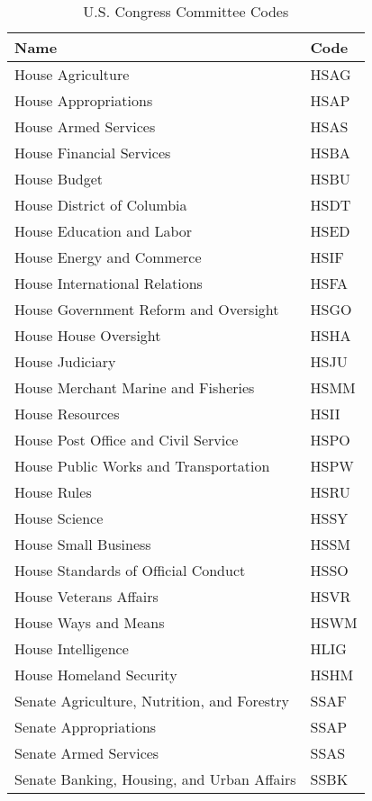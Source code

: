 \documentclass[10pt,a4paper]{article}
\begin{document}
\begin{table}  \centering
\caption{U.S. Congress Committee Codes}
\label{tab:committee}
\begin{tabular}{ll}
\textbf{Name} & \textbf{Code} \\
\hline
\rowcolor{gray!30}
House Agriculture	 &	HSAG	\\
House Appropriations	&	HSAP	\\
\rowcolor{gray!30}
House Armed Services	&	HSAS \\
House Financial Services	&	HSBA	\\
\rowcolor{gray!30}
House Budget	&	HSBU	\\
House District of Columbia	&	HSDT	\\
\rowcolor{gray!30}
House Education and Labor	&	HSED	\\
House Energy and Commerce	&	HSIF	\\
\rowcolor{gray!30}
House International Relations	&	HSFA	\\
House Government Reform and Oversight	&	HSGO	\\
\rowcolor{gray!30}
House House Oversight 	&	HSHA	\\
House Judiciary	&	HSJU	\\
\rowcolor{gray!30}
House Merchant Marine and Fisheries	&	HSMM	\\
House Resources	&	HSII	\\
\rowcolor{gray!30}
House Post Office and Civil Service	&	HSPO	\\
House Public Works and Transportation	&	HSPW	\\
\rowcolor{gray!30}
House Rules	&	HSRU	\\
House Science	&	HSSY	\\
\rowcolor{gray!30}
House Small Business	&	HSSM	\\
House Standards of Official Conduct	&	HSSO	\\
\rowcolor{gray!30}
House Veterans Affairs	&	HSVR	\\
House Ways and Means	&	HSWM	\\
\rowcolor{gray!30}
House Intelligence	&	HLIG	\\
House Homeland Security	&	HSHM	\\
\rowcolor{gray!30}
Senate Agriculture, Nutrition, and Forestry	&	SSAF	\\
Senate Appropriations	&	SSAP	\\
\rowcolor{gray!30}
Senate Armed Services	&	SSAS	\\
Senate Banking, Housing, and Urban Affairs	&	SSBK	\\

\end{tabular}
\end{table}
\end{document}
